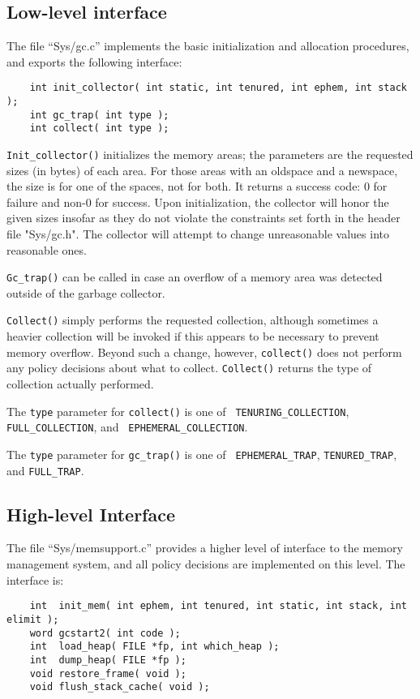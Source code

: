 \subsection{Low-level interface}

The file ``Sys/gc.c'' implements the basic initialization and allocation
procedures, and exports the following interface:

\begin{verbatim}
    int init_collector( int static, int tenured, int ephem, int stack );
    int gc_trap( int type );
    int collect( int type );
\end{verbatim}

{\tt Init\_collector()} initializes the memory areas; the parameters are the
requested sizes (in bytes) of each area. For those areas with an oldspace
and a newspace, the size is for one of the spaces, not for both. It returns
a success code: 0 for failure and non-0 for success.  Upon initialization,
the collector will honor the given sizes insofar as they do not violate the
constraints set forth in the header file "Sys/gc.h".  The collector will
attempt to change unreasonable values into reasonable ones.

{\tt Gc\_trap()} can be called in case an overflow of a memory area was
detected outside of the garbage collector.

{\tt Collect()} simply performs the requested collection, although sometimes
a heavier collection will be invoked if this appears to be necessary to
prevent memory overflow. Beyond such a change, however, {\tt collect()} does
not perform any policy decisions about what to collect. {\tt Collect()}
returns the type of collection actually performed.

The {\tt type} parameter for {\tt collect()} is one of {\tt
TENURING\_COLLECTION}, {\tt FULL\_COLLECTION}, and {\tt
EPHEMERAL\_COLLECTION}.

The {\tt type} parameter for {\tt gc\_trap()} is one of {\tt
EPHEMERAL\_TRAP}, {\tt TENURED\_TRAP}, and {\tt FULL\_TRAP}.

\subsection{High-level Interface}

The file ``Sys/memsupport.c'' provides a higher level of interface to the
memory management system, and all policy decisions are implemented on
this level. The interface is:

\begin{minipage}{\linewidth}
\begin{verbatim}
    int  init_mem( int ephem, int tenured, int static, int stack, int elimit );
    word gcstart2( int code );
    int  load_heap( FILE *fp, int which_heap );
    int  dump_heap( FILE *fp );
    void restore_frame( void );
    void flush_stack_cache( void );
\end{verbatim}
\end{minipage}

